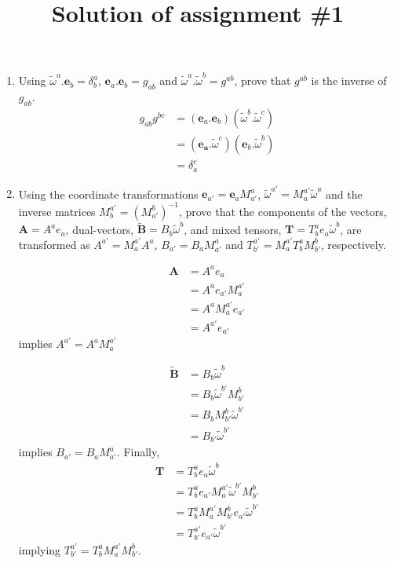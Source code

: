 \documentclass[10pt]{article}
\title{Solution of assignment \#1}
\begin{document}
\maketitle
\begin{enumerate}
\item Using $\tilde{\omega}^a.\boldsymbol{e}_b = \delta^a_b$, $\boldsymbol{e}_a.\boldsymbol{e}_b = g_{ab}$ and $\tilde{\omega}^a.\tilde{\omega}^b = g^{ab}$, prove that $g^{ab}$ is the inverse of $g_{ab}$.
  \begin{align}
    \label{eq:1}
    g_{ab}g^{bc}
    & = (\boldsymbol{e}_a . \boldsymbol{e}_b) (\tilde{\omega}^b . \tilde{\omega}^c)\\
    & = (\boldsymbol{e_a}.\tilde{\omega}^c) (\boldsymbol{e}_b . \tilde{\omega}^b)\\
    & = \delta^c_a
  \end{align}
\item Using the coordinate transformations $\boldsymbol{e}_{a'} = \boldsymbol{e}_{a}M^a_{a'}$, $\tilde{\omega}^{a'} = M^{a'}_{a}\tilde{\omega}^a$ and the inverse matrices $M^{a'}_b = (M^b_{a'})^{-1}$, prove that the components of the vectors, $\boldsymbol{A} = A^ae_a$, dual-vectors, $\tilde{\boldsymbol{B}} = B_b \tilde{\omega}^b$, and mixed tensors, $\boldsymbol{T} = T^a_b e_a \tilde{\omega}^b$, are transformed as $A^{a'} = M^{a'}_a A^a$, $B_{a'} = B_a M^{a}_{a'}$ and $T^{a'}_{b'} = M^{a'}_a T^a_b M^{b}_{b'}$, respectively.

  \begin{align}
    \label{eq:2}
    \boldsymbol{A}
    & = A^{a}e_{a}\\
    & = A^{a}e_{a'} M^{a'}_{a}\\
    & = A^{a}M^{a'}_{a}e_{a'}\\
    & = A^{a'} e_{a'}
  \end{align}
  implies $A^{a'} = A^{a}M^{a'}_{a}$

  \begin{align}
    \label{eq:3}
    \boldsymbol{\tilde{B}}
    & = B_b\tilde{\omega}^b\\
    & = B_b \tilde{\omega}^{b'} M^{b}_{b'}\\
    & = B_b M^{b}_{b'}\tilde{\omega}^{b'}\\
    & = B_{b'}\tilde{\omega}^{b'}
  \end{align}
  implies $B_{a'} = B_{a} M^{a}_{a'}$.
  Finally,
  \begin{align}
    \label{eq:4}
    \boldsymbol{T}
    & = T^{a}_b e_a \tilde{\omega}^b\\
    & = T^{a}_b e_{a'}M^{a'}_{a}\tilde{\omega}^{b'}M^{b}_{b'}\\
    & = T^{a}_{b}M^{a'}_{a}M^{b}_{b'}e_{a'}\tilde{\omega}^{b'}\\
    & = T^{a'}_{b'}e_{a'}\tilde{\omega}^{b'}
  \end{align}
  implying $T^{a'}_{b'} = T^{a}_{b} M^{a'}_{a}M^{b}_{b'}$.
  

\end{enumerate}
\end{document}
